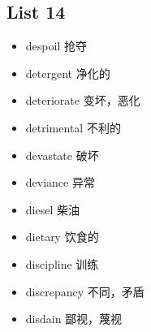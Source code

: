 \documentclass[a4paper,10pt]{article}
\begin{document}
\begin{CJK*}{UTF8}{gkai}
\section{List 14}
\begin{itemize}
\item despoil 抢夺
\hspace{1cm}
\item detergent 净化的
\hspace{1cm}
\item deteriorate 变坏，恶化
\hspace{1cm}
\item detrimental 不利的
\hspace{1cm}
\item devastate 破坏
\hspace{1cm}
\item deviance 异常
\hspace{1cm}
\item diesel 柴油
\hspace{1cm}
\item dietary 饮食的
\hspace{1cm}
\item discipline 训练
\hspace{1cm}
\item discrepancy 不同，矛盾
\hspace{1cm}
\item disdain 鄙视，蔑视
\hspace{1cm}
\end{itemize}

\newpage

\end{CJK*}
\end{document}
